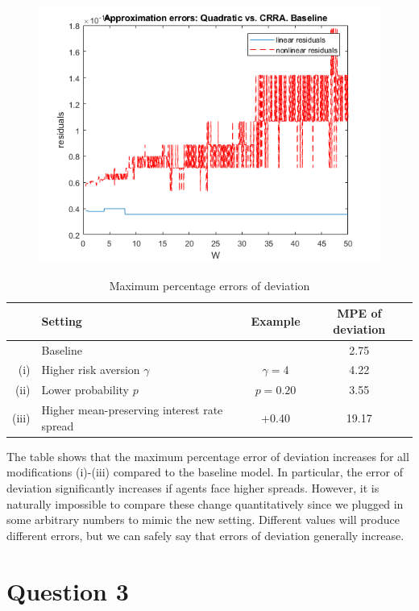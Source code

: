 \documentclass{article}
\begin{document}
\begin{figure}[h!]\begin{center}
\includegraphics[width = .8\textwidth, keepaspectratio]{ps4ex2fig2.png}\end{center}
\end{figure}

\begin{table}[H]
\centering
\caption{Maximum percentage errors of deviation}
\vspace{.5cm}
\begin{tabular}{rlcc}
\hline
 & Setting & Example & MPE of deviation \\[.5em]
 \hline
 & Baseline & & 2.75 \\[1em]
 (i) & Higher risk aversion $\gamma$ & $\gamma = 4$ & 4.22 \\[1em]
 (ii) & Lower probability $p$ & $p = 0.20$ & 3.55 \\[1em]
 (iii) & Higher mean-preserving interest rate spread & +0.40 & 19.17\\[1em]
 \hline
\end{tabular}
\end{table}

The table shows that the maximum percentage error of deviation increases for all modifications (i)-(iii) compared to the baseline model. In particular, the error of deviation significantly increases if agents face higher spreads. However, it is naturally impossible to compare these change quantitatively since we plugged in some arbitrary numbers to mimic the new setting. Different values will produce different errors, but we can safely say that errors of deviation generally increase.

\section{Question 3}
\end{document}
